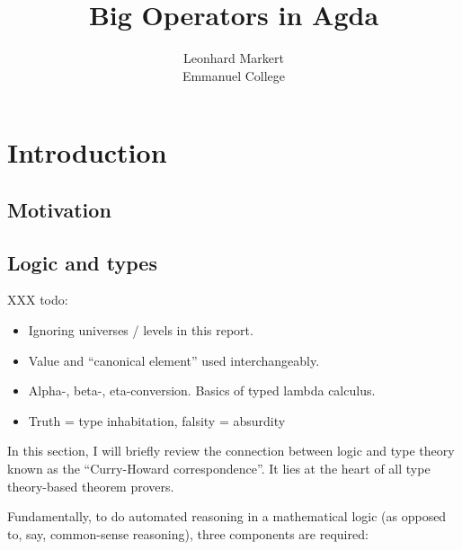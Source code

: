 

\title{Big Operators in Agda}
\author{Leonhard Markert \\ Emmanuel College}



\begin{titlepage}
\maketitle
\tableofcontents
\end{titlepage}

\chapter{Introduction}

\section{Motivation}

\section{Logic and types}

XXX todo:
\begin{itemize}
\item Ignoring universes / levels in this report.
\item Value and \enquote{canonical element} used interchangeably.
\item Alpha-, beta-, eta-conversion. Basics of typed lambda calculus.
\item Truth = type inhabitation, falsity = absurdity
\end{itemize}

In this section, I will briefly review the connection between logic and type theory known as the \enquote{Curry-Howard correspondence}. It lies at the heart of all type theory-based theorem provers.

Fundamentally, to do automated reasoning in a mathematical logic (as opposed to, say, common-sense reasoning), three components are required:

